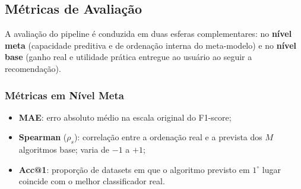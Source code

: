 \documentclass[12pt]{article}
\begin{document}
\subsection{Métricas de Avaliação}

A avaliação do pipeline é conduzida em duas esferas complementares: no \textbf{nível meta} (capacidade preditiva e de ordenação interna do meta-modelo) e no \textbf{nível base} (ganho real e utilidade prática entregue ao usuário ao seguir a recomendação).

\subsubsection{Métricas em Nível Meta}
\begin{itemize}
  \item \textbf{MAE}: erro absoluto médio na escala original do F1-score;
  \item \textbf{Spearman} ($\rho_s$): correlação entre a ordenação real e a prevista dos $M$ algoritmos base; varia de $-1$ a $+1$;
  \item \textbf{Acc@1}: proporção de datasets em que o algoritmo previsto em $1^\circ$ lugar coincide com o melhor classificador real.
\end{itemize}
\end{document}
